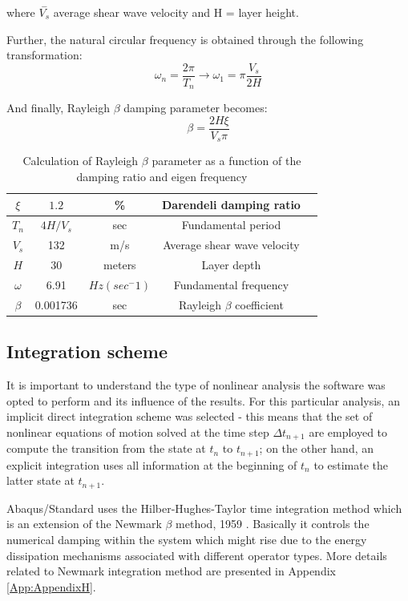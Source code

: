 	where $\stackrel{-}{{V}_{s}}$ average shear wave velocity and H = layer height.
	
	Further, the natural circular frequency is obtained through the following transformation:
	\begin{equation}
	\omega_n=\frac{2\pi}{T_n} \rightarrow \omega_1=\pi\frac{V_s}{2H}
	\end{equation}
	
	And finally, Rayleigh $\beta$ damping parameter becomes:
	\begin{equation}
	\beta=\frac{2H\xi}{V_s\pi}
	\end{equation}
	
	\begin{table}[h!]
		\centering
		\begin{tabular}{|c|c|c|c|c|}
			\hline $\xi$         &       $1.2$    &  \%    &  Darendeli damping ratio      \\ 
			\hline $T_n$    & $4H/V_s$ &  sec &  Fundamental period\\ 
			\hline $V_s$  & 132  &  m/s &  Average shear wave velocity\\ 
			\hline $H$ & 30 &  meters &  Layer depth\\
			\hline $\omega$ & 6.91 & $Hz (sec^-1)$ & Fundamental frequency\\
			\hline $\beta$ & 0.001736 & sec & Rayleigh $\beta$ coefficient\\
			\hline
		\end{tabular} 
		\caption{Calculation of Rayleigh $\beta$ parameter as a function of the damping ratio and eigen frequency}
		\label{beta_param}
	\end{table}
	
	\subsection{Integration scheme} \label{sectionNew}
	It is important to understand the type of nonlinear analysis the software was opted to perform and its influence of the results. For this particular analysis, an implicit direct integration scheme was selected - this means that the set of nonlinear equations of motion solved at the time step $\Delta t_{n+1}$ are employed to compute the transition from the state at $t_n$ to $t_{n+1}$; on the other hand, an explicit integration uses all information at the beginning of $t_n$ to estimate the latter state at $t_{n+1}$.
	
	Abaqus/Standard uses the Hilber-Hughes-Taylor time integration method \cite{hilber1977improved} which is an extension of the Newmark $\beta$ method, 1959 \cite{newmark1959method}. Basically it controls the numerical damping within the system which might rise due to the energy dissipation mechanisms associated with different operator types. More details related to Newmark integration method are presented in Appendix \ref{App:AppendixH}.
	
